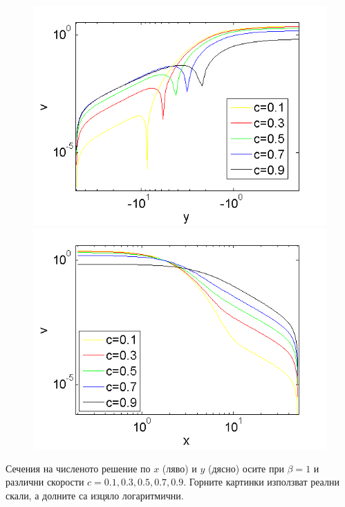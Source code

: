 \documentclass{beamer}
\begin{document}
\begin{frame}
\begin{figure}
\begin{minipage}[b]{0.45\linewidth}
		\raggedleft
		\includegraphics[width=\linewidth]{../Thesis/SolutionProfiles/ChristovIVLogX=0_ZB2_bt1_c010_090_h020_O(h^6).png}
	\end{minipage}	
	\begin{minipage}[b]{0.45\linewidth}
		\raggedright
		 \includegraphics[width=\linewidth]{../Thesis/SolutionProfiles/ChristovIVLogY=0_ZB2_bt1_c010_090_h020_O(h^6).png}
	\end{minipage}
	\label{profilesSpeedVarying}
\end{figure}

Сечения на численото решение по $x$ (ляво) и $y$ (дясно) осите при $\beta=1$ и различни скорости $c=0.1,0.3,0.5,0.7,0.9$. Горните картинки използват реални скали, а долните са изцяло логаритмични.
\end{frame}
\end{document}
